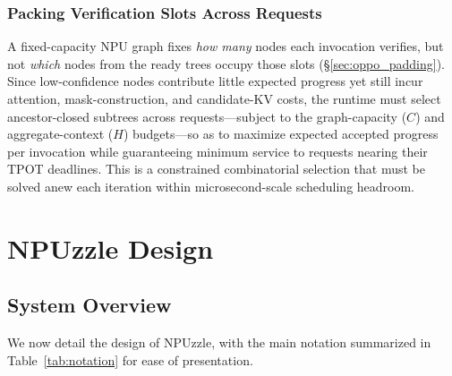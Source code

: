 \documentclass[sigconf,nonacm,10pt]{acmart}
\newcommand{\name}{NPUzzle\xspace}
\begin{document}
\subsubsection{Packing Verification Slots Across Requests} \label{sec:challenge_packing}
A fixed-capacity NPU graph fixes \emph{how many} nodes each invocation verifies, but not \emph{which} nodes from the ready trees occupy those slots (\S\ref{sec:oppo_padding}). Since low-confidence nodes contribute little expected progress yet still incur attention, mask-construction, and candidate-KV costs, the runtime must select ancestor-closed subtrees across requests---subject to the graph-capacity ($C$) and aggregate-context ($H$) budgets---so as to maximize expected accepted progress per invocation while guaranteeing minimum service to requests nearing their TPOT deadlines. This is a constrained combinatorial selection that must be solved anew each iteration within microsecond-scale scheduling headroom.

\section{\name Design}
\subsection{System Overview} \label{sec:sys_overview}
We now detail the design of \name, with the main notation summarized in Table~\ref{tab:notation} for ease of presentation.
\end{document}
